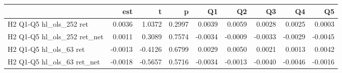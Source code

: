 \begin{tabular}{lrrrrrrrr}
\toprule
 & est & t & p & Q1 & Q2 & Q3 & Q4 & Q5 \\
\midrule
H2 Q1-Q5 hl_ols_252 ret & 0.0036 & 1.0372 & 0.2997 & 0.0039 & 0.0059 & 0.0028 & 0.0025 & 0.0003 \\
H2 Q1-Q5 hl_ols_252 ret_net & 0.0011 & 0.3089 & 0.7574 & -0.0034 & -0.0009 & -0.0033 & -0.0029 & -0.0045 \\
H2 Q1-Q5 hl_ols_63 ret & -0.0013 & -0.4126 & 0.6799 & 0.0029 & 0.0050 & 0.0021 & 0.0013 & 0.0042 \\
H2 Q1-Q5 hl_ols_63 ret_net & -0.0018 & -0.5657 & 0.5716 & -0.0034 & -0.0013 & -0.0040 & -0.0046 & -0.0016 \\
\bottomrule
\end{tabular}
